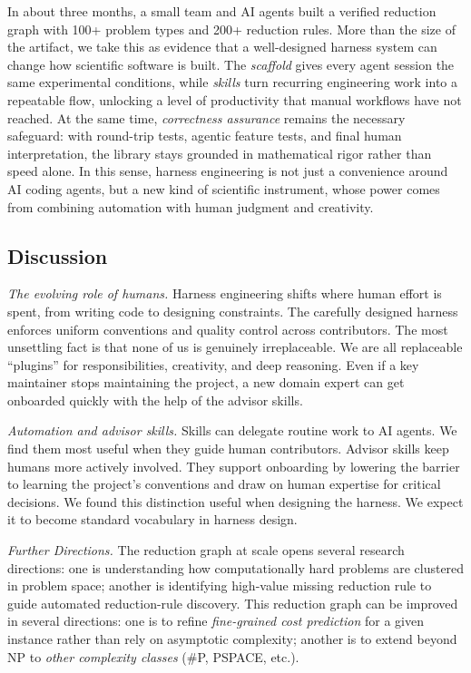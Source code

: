 \documentclass[conference]{IEEEtran}
\begin{document}
In about three months, a small team and AI agents built a verified reduction graph with 100+ problem
types and 200+ reduction rules. More than the size of the artifact, we take this as evidence that a well-designed harness system can change how scientific software is built. The \emph{scaffold} gives every
agent session the same experimental conditions, while \emph{skills}
turn recurring engineering work into a repeatable flow, unlocking a level of productivity that manual
workflows have not reached.
At the same time, \emph{correctness assurance} remains the necessary
safeguard: with round-trip tests, agentic feature tests, and final human interpretation, the library stays
grounded in mathematical rigor rather than speed alone. In this sense, harness engineering is not just a
convenience around AI coding agents, but a new kind of scientific instrument, whose power comes from
combining automation with human judgment and creativity.


\subsection{Discussion}

\emph{The evolving role of humans.} Harness engineering shifts where human effort is spent, from writing code to designing constraints. The carefully designed harness enforces uniform conventions and quality control across contributors. The most unsettling fact is that none of us is genuinely irreplaceable. We are all replaceable ``plugins'' for responsibilities, creativity, and deep reasoning. Even if a key maintainer stops maintaining the project, a new domain expert can get onboarded quickly with the help of the advisor skills.

\emph{Automation and advisor skills.} Skills can delegate routine work to AI agents. We find them most useful when they guide human contributors. Advisor skills keep humans more actively involved. They support onboarding by lowering the barrier to learning the project's conventions and draw on human expertise for critical decisions. We found this distinction useful when designing the harness. We expect it to become standard vocabulary in harness design.

\emph{Further Directions.}
The reduction graph at scale opens several research directions: one is understanding how computationally hard problems are clustered in problem space; another is identifying high-value missing reduction rule to guide automated reduction-rule discovery.
This reduction graph can be improved in several directions: one is to refine \emph{fine-grained cost prediction} for a given instance rather than rely on asymptotic complexity; another is to extend beyond NP to \emph{other complexity classes} (\#P, PSPACE, etc.).
\end{document}

